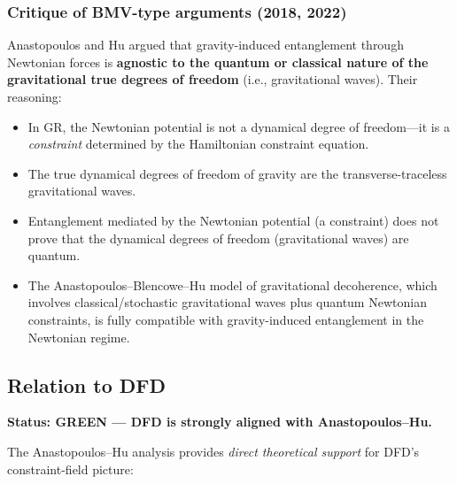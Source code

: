 \documentclass[12pt,a4paper]{article}
\newcommand{\GREEN}{\textcolor{dfdgreen}{\textbf{GREEN}}}
\begin{document}
\subsubsection{Critique of BMV-type arguments (2018, 2022)}

Anastopoulos and Hu argued that gravity-induced entanglement through Newtonian forces is \textbf{agnostic to the quantum or classical nature of the gravitational true degrees of freedom} (i.e., gravitational waves). Their reasoning:

\begin{itemize}
\item In GR, the Newtonian potential is not a dynamical degree of freedom---it is a \emph{constraint} determined by the Hamiltonian constraint equation.
\item The true dynamical degrees of freedom of gravity are the transverse-traceless gravitational waves.
\item Entanglement mediated by the Newtonian potential (a constraint) does not prove that the dynamical degrees of freedom (gravitational waves) are quantum.
\item The Anastopoulos--Blencowe--Hu model of gravitational decoherence, which involves classical/stochastic gravitational waves plus quantum Newtonian constraints, is fully compatible with gravity-induced entanglement in the Newtonian regime.
\end{itemize}

\subsection{Relation to DFD}

\textbf{Status: \GREEN{} --- DFD is strongly aligned with Anastopoulos--Hu.}

The Anastopoulos--Hu analysis provides \emph{direct theoretical support} for DFD's constraint-field picture:
\end{document}
